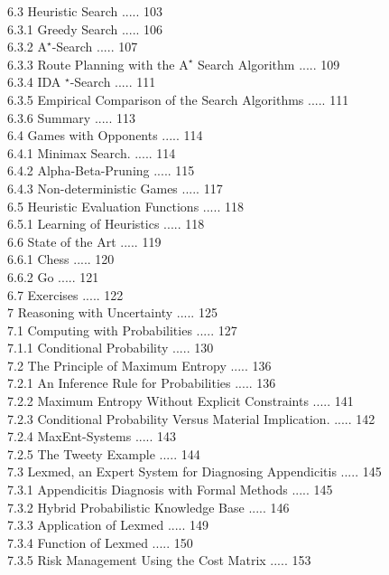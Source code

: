\documentclass[10pt]{book}
\begin{document}
6.3 Heuristic Search ..... 103\\
6.3.1 Greedy Search ..... 106\\
6.3.2 $\mathrm{A}^{\star}$-Search ..... 107\\
6.3.3 Route Planning with the $\mathrm{A}^{\star}$ Search Algorithm ..... 109\\
6.3.4 IDA $^{\star}$-Search ..... 111\\
6.3.5 Empirical Comparison of the Search Algorithms ..... 111\\
6.3.6 Summary ..... 113\\
6.4 Games with Opponents ..... 114\\
6.4.1 Minimax Search. ..... 114\\
6.4.2 Alpha-Beta-Pruning ..... 115\\
6.4.3 Non-deterministic Games ..... 117\\
6.5 Heuristic Evaluation Functions ..... 118\\
6.5.1 Learning of Heuristics ..... 118\\
6.6 State of the Art ..... 119\\
6.6.1 Chess ..... 120\\
6.6.2 Go ..... 121\\
6.7 Exercises ..... 122\\
7 Reasoning with Uncertainty ..... 125\\
7.1 Computing with Probabilities ..... 127\\
7.1.1 Conditional Probability ..... 130\\
7.2 The Principle of Maximum Entropy ..... 136\\
7.2.1 An Inference Rule for Probabilities ..... 136\\
7.2.2 Maximum Entropy Without Explicit Constraints ..... 141\\
7.2.3 Conditional Probability Versus Material Implication. ..... 142\\
7.2.4 MaxEnt-Systems ..... 143\\
7.2.5 The Tweety Example ..... 144\\
7.3 Lexmed, an Expert System for Diagnosing Appendicitis ..... 145\\
7.3.1 Appendicitis Diagnosis with Formal Methods ..... 145\\
7.3.2 Hybrid Probabilistic Knowledge Base ..... 146\\
7.3.3 Application of Lexmed ..... 149\\
7.3.4 Function of Lexmed ..... 150\\
7.3.5 Risk Management Using the Cost Matrix ..... 153\\
\end{document}
